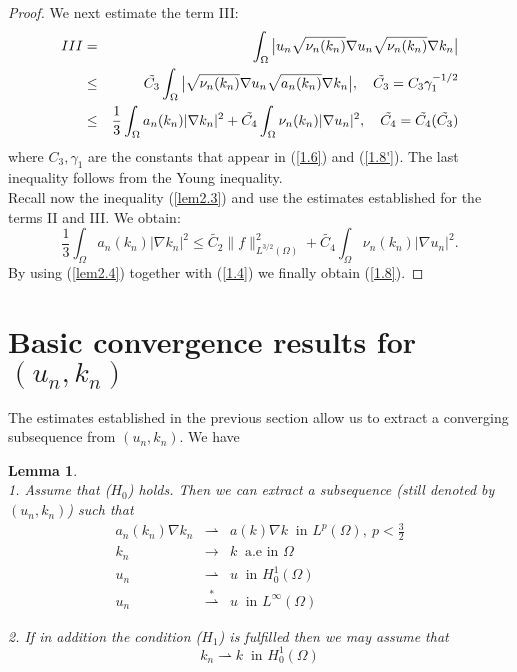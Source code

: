 \documentclass{elsart}
\newtheorem{lemm}[defi]{Lemma}
\begin{document}
\begin{proof}
We next estimate the term III:
\begin{eqnarray}
III &=& \int_{\Omega} \big| u_n \sqrt{\nu_n(k_n)} \nabla u_n 
\sqrt{\nu_n(k_n)} \nabla k_n \big| \notag \\ 
&\leq& \tilde{C_3} \int_{\Omega} \big| \sqrt{\nu_n(k_n)} \nabla u_n 
\sqrt{a_n(k_n)} \nabla k_n \big|, \quad 
\tilde{C_3}=C_3 \gamma_1^{-1/2} \notag   \\ 
&\leq& \frac{1}{3}\int_{\Omega} a_n(k_n)|\nabla k_n |^2 + 
\tilde{C_4} \int_{\Omega} \nu_n(k_n)|\nabla u_n |^2, \quad 
\tilde{C_4}=\tilde{C_4}(\tilde{C_3}) \notag
\end{eqnarray}
where $C_3, \gamma_1$ are the constants that appear in (\ref{1.6}) and (\ref{1.8'}). The last
inequality follows from the Young inequality. \\ 
Recall now the inequality (\ref{lem2.3}) and use the estimates
established for the terms II and III. We obtain: 
\begin{equation}
\frac{1}{3}\int_{\Omega} a_n(k_n)|\nabla k_n |^2 \leq 
\tilde{C_2} \|f\|_{L^{3/2}(\Omega)}^2 + \tilde{C_4} \int_{\Omega} \nu_n(k_n)|\nabla u_n |^2. 
\label{lem2.4}
\end{equation}
By using (\ref{lem2.4}) together with (\ref{1.4}) we finally obtain 
(\ref{1.8}).
\end{proof}

\section{Basic convergence results for $(u_n,k_n)$} \label{sec2}

The estimates established in the previous section allow us to extract a
converging subsequence from $(u_n,k_n)$. We have 

\begin{lemm} \label{lem3} \noindent \\  
1. Assume that ($H_0$) holds. Then we can extract a subsequence 
(still denoted by $(u_n,k_n)$) such that 
\begin{eqnarray}
a_n(k_n) \nabla k_n &\rightharpoonup& a(k)\nabla k \ \text{ in }
L^p(\Omega), \ p < \frac{3}{2} \label{2.1} \\
k_n &\rightarrow& k \ \text{ a.e in }\Omega \label{2.2} \\
u_n &\rightharpoonup& u \ \text{ in } H_0^1(\Omega) \label{2.3} \\
u_n &\overset{*}{\rightharpoonup}& u \ \text{ in }
L^{\infty}(\Omega)\label{2.4}
\end{eqnarray}

2. If in addition the condition ($H_1$) is fulfilled then we may assume
   that 
\begin{equation}
k_n \rightharpoonup k \ \text{ in } H_0^1(\Omega) \label{2.5}
\end{equation}
\end{lemm}
\end{document}

